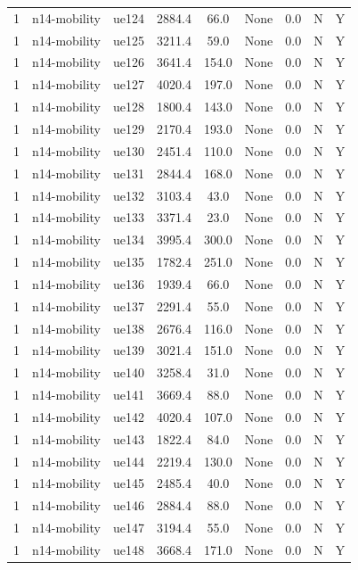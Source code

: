 \begin{table}[ht]
\begin{tabular}{|c|c|c|c|c|c|c|c|c|}
1 & n14-mobility & ue124 & 2884.4 & 66.0 & None & 0.0 & N & Y \\
1 & n14-mobility & ue125 & 3211.4 & 59.0 & None & 0.0 & N & Y \\
1 & n14-mobility & ue126 & 3641.4 & 154.0 & None & 0.0 & N & Y \\
1 & n14-mobility & ue127 & 4020.4 & 197.0 & None & 0.0 & N & Y \\
1 & n14-mobility & ue128 & 1800.4 & 143.0 & None & 0.0 & N & Y \\
1 & n14-mobility & ue129 & 2170.4 & 193.0 & None & 0.0 & N & Y \\
1 & n14-mobility & ue130 & 2451.4 & 110.0 & None & 0.0 & N & Y \\
1 & n14-mobility & ue131 & 2844.4 & 168.0 & None & 0.0 & N & Y \\
1 & n14-mobility & ue132 & 3103.4 & 43.0 & None & 0.0 & N & Y \\
1 & n14-mobility & ue133 & 3371.4 & 23.0 & None & 0.0 & N & Y \\
1 & n14-mobility & ue134 & 3995.4 & 300.0 & None & 0.0 & N & Y \\
1 & n14-mobility & ue135 & 1782.4 & 251.0 & None & 0.0 & N & Y \\
1 & n14-mobility & ue136 & 1939.4 & 66.0 & None & 0.0 & N & Y \\
1 & n14-mobility & ue137 & 2291.4 & 55.0 & None & 0.0 & N & Y \\
1 & n14-mobility & ue138 & 2676.4 & 116.0 & None & 0.0 & N & Y \\
1 & n14-mobility & ue139 & 3021.4 & 151.0 & None & 0.0 & N & Y \\
1 & n14-mobility & ue140 & 3258.4 & 31.0 & None & 0.0 & N & Y \\
1 & n14-mobility & ue141 & 3669.4 & 88.0 & None & 0.0 & N & Y \\
1 & n14-mobility & ue142 & 4020.4 & 107.0 & None & 0.0 & N & Y \\
1 & n14-mobility & ue143 & 1822.4 & 84.0 & None & 0.0 & N & Y \\
1 & n14-mobility & ue144 & 2219.4 & 130.0 & None & 0.0 & N & Y \\
1 & n14-mobility & ue145 & 2485.4 & 40.0 & None & 0.0 & N & Y \\
1 & n14-mobility & ue146 & 2884.4 & 88.0 & None & 0.0 & N & Y \\
1 & n14-mobility & ue147 & 3194.4 & 55.0 & None & 0.0 & N & Y \\
1 & n14-mobility & ue148 & 3668.4 & 171.0 & None & 0.0 & N & Y \\

\end{tabular}
\end{table}
